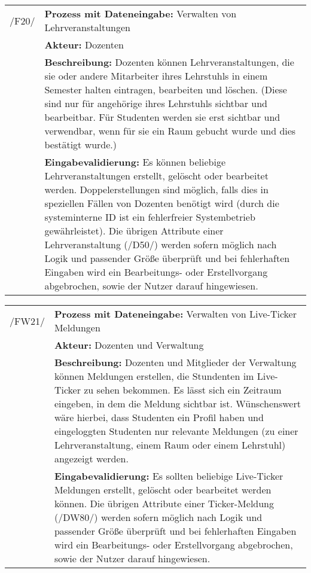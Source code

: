 \begin{tabular}{p{1.5cm}p{14.5cm}}
		
	 /F20/	& \textbf{Prozess mit Dateneingabe:} Verwalten von Lehrveranstaltungen \\
				& \textbf{Akteur:} Dozenten \\
				& \textbf{Beschreibung:} Dozenten können Lehrveranstaltungen, die sie oder andere Mitarbeiter ihres Lehrstuhls in einem Semester halten eintragen, bearbeiten und löschen. (Diese sind nur für angehörige ihres Lehrstuhls sichtbar und bearbeitbar. Für Studenten werden sie erst sichtbar und verwendbar, wenn für sie ein Raum gebucht wurde und dies bestätigt wurde.) \\
				& \textbf{Eingabevalidierung:} Es können beliebige Lehrveranstaltungen erstellt, gelöscht oder bearbeitet werden. Doppelerstellungen sind möglich, falls dies in speziellen Fällen von Dozenten benötigt wird (durch die systeminterne ID ist ein fehlerfreier Systembetrieb gewährleistet). Die übrigen Attribute einer Lehrveranstaltung (/D50/) werden sofern möglich nach Logik und passender Größe überprüft und bei fehlerhaften Eingaben wird ein Bearbeitungs- oder Erstellvorgang abgebrochen, sowie der Nutzer darauf hingewiesen.\\[0.25cm]

\end{tabular}


\begin{tabular}{p{1.5cm}p{14.5cm}}
	
	 /FW21/& \textbf{Prozess mit Dateneingabe:} Verwalten von Live-Ticker Meldungen \\
				& \textbf{Akteur:} Dozenten und Verwaltung \\
				& \textbf{Beschreibung:} Dozenten und Mitglieder der Verwaltung können Meldungen erstellen, die Stundenten im Live-Ticker zu sehen bekommen. Es lässt sich ein Zeitraum eingeben, in dem die Meldung sichtbar ist. Wünschenswert wäre hierbei, dass Studenten ein Profil haben und eingeloggten Studenten nur relevante Meldungen (zu einer Lehrveranstaltung, einem Raum oder einem Lehrstuhl) angezeigt werden. \\
				& \textbf{Eingabevalidierung:} Es sollten beliebige Live-Ticker Meldungen erstellt, gelöscht oder bearbeitet werden können. Die übrigen Attribute einer Ticker-Meldung (/DW80/) werden sofern möglich nach Logik und passender Größe überprüft und bei fehlerhaften Eingaben wird ein Bearbeitungs- oder Erstellvorgang abgebrochen, sowie der Nutzer darauf hingewiesen.\\[0.25cm]

\end{tabular}


